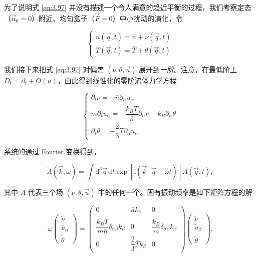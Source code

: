 为了说明式 \eqref{eq:3.97} 并没有描述一个令人满意的趋近平衡的过程，我们考察定态（$\vec u_0=0$）附近、均匀盒子（$\vec F=0$）中小扰动的演化，令

\begin{equation}\label{eq:3.100}
  \begin{cases}
    n(\vec q,t)=\bar n+\nu(\vec q,t)\\[4pt]
    T(\vec q,t)=\bar T+\theta(\vec q,t)
  \end{cases}
\end{equation}

我们接下来把式 \eqref{eq:3.97} 对偏差 $(\nu,\theta,\vec u)$ 展开到\emph{一阶}。注意，在最低阶上 $D_t=\partial_t+O(u)$，由此得到线性化的零阶流体力学方程

\begin{equation}\label{eq:3.101}
  \begin{cases}
    \partial_t\nu=-\bar n\partial_\alpha u_\alpha\\[4pt]
    m\partial_tu_\alpha=-\dfrac{k_B\bar T}{\bar n}\partial_\alpha\nu-k_B\partial_\alpha\theta\\[4pt]
    \partial_t\theta=-\dfrac{2}{3}\bar T\partial_\alpha u_\alpha
  \end{cases}
\end{equation}

系统的通过 Fourier 变换得到，

\begin{equation}\label{eq:3.102}
  \tilde A\left(\vec k,\omega\right)=\int \mathrm{d}^3\vec q\,\mathrm{d}t\exp\left[\mathrm{i}\left(\vec k\cdot\vec q-\omega t\right)\right]A\left(\vec q,t\right),
\end{equation}

其中 $A$ 代表三个场 $(\nu,\theta,\vec u)$ 中的任何一个。固有振动频率是如下矩阵方程的解

\begin{equation}\label{eq:3.103}
  \omega\begin{pmatrix}\tilde\nu\\ \tilde u_\alpha\\ \tilde\theta\end{pmatrix}=
  \begin{pmatrix}
    0 & \bar nk_\beta & 0\\[4pt]
    \dfrac{k_B\bar T}{m\bar n}\delta_{\alpha\beta}k_\beta & 0 & \dfrac{k_B}{m}\delta_{\alpha\beta}k_\beta\\[4pt]
    0 & \dfrac{2}{3}\bar Tk_\beta & 0
  \end{pmatrix}
  \begin{pmatrix}\tilde\nu\\ \tilde u_\beta\\ \tilde\theta\end{pmatrix}.
\end{equation}

